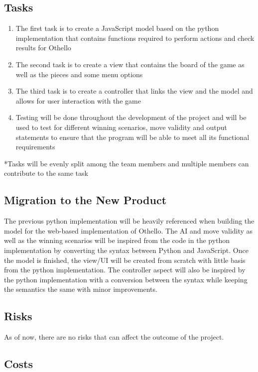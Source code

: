 \documentclass[12pt, titlepage]{article}
\begin{document}
\subsection{Tasks}
\begin{enumerate}
	\item The first task is to create a JavaScript model based on the python implementation that contains functions required to perform actions and check results for Othello
	\item The second task is to create a view that contains the board of the game as well as the pieces and some menu options
	\item The third task is to create a controller that links the view and the model and allows for user interaction with the game
	\item Testing will be done throughout the development of the project and will be used to test for different winning scenarios, move validity and output statements to ensure that the program will be able to meet all its functional requirements
\end{enumerate}

*Tasks will be evenly split among the team members and multiple members can contribute to the same task

\subsection{Migration to the New Product}

The previous python implementation will be heavily referenced when building the model for the web-based implementation of Othello. The AI and move validity as well as the winning scenarios will be inspired from the code in the python implementation by converting the syntax between Python and JavaScript. Once the model is finished, the view/UI will be created from scratch with little basis from the python implementation. The controller aspect will also be inspired by the python implementation with a conversion between the syntax while keeping the semantics the same with minor improvements.

\subsection{Risks}

As of now, there are no risks that can affect the outcome of the project.

\subsection{Costs}
\end{document}
